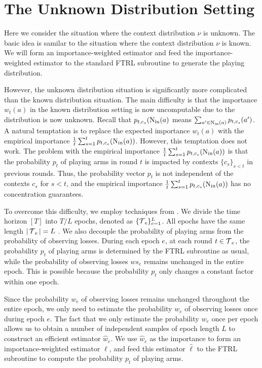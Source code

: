 \section{The Unknown Distribution Setting}

Here we consider the situation where the context distribution $\nu$ is unknown. The basic idea is samilar to the situation where the  context distribution $\nu$ is known. We will form an importance-weighted estimator and feed the importance-weighted estimator to the standard FTRL subroutine to generate the playing distribution.

However, the unknown distribution situation is significantly more complicated than the known distribution situation. The main difficulty is that the importance $w_t(a)$ in the known distribution setting is now uncomputable  due to the distribution is now unknown. 
%
Recall that $p_{t,c_s}(\operatorname{N_{\text{in}}}(a)$ means  $\sum_{a' \in \operatorname{N_{\text{in}}}(a)} p_{t,c_s}(a')$.
%
A natural temptation is to replace the expected importance $w_t(a)$ with the empirical importance  $\frac{1}{t} \sum_{s=1}^t  p_{t,c_s}(\operatorname{N_{\text{in}}}(a))$.
%
However, this temptation does not work. The problem with the empirical importance $\frac{1}{t} \sum_{s=1}^t p_{t,c_s}(\operatorname{N_{\text{in}}}(a))$ is that the probability $p_t$ of playing arms in round $t$ is impacted by contexts $\{c_s\}_{s < t}$ in previous rounds. Thus, the  probability vector $p_t$ is not independent of the contexts $c_s$ for $s<t$, and the empirical importance  $\frac{1}{t} \sum_{s=1}^t  p_{t,c_s}(\operatorname{N_{\text{in}}}(a))$ has no concentration guarantees.

To overcome this difficulty, we employ techniques from \citet{Sch23}. We divide the time horizon $[T]$ into $T/L$ epochs, denoted as $\{\operatorname{\mathcal{T}}_e\}_{e = 1}^{L}$. All epochs have the same length $|\operatorname{\mathcal{T}}_e| = L$ . We also decouple the probability of playing arms from the probability of observing losses. During each epoch $e$, at each round $t \in \operatorname{\mathcal{T}}_e$, the probability $p_t$ of playing arms is determined by the FTRL subroutine as usual, while the probability of observing losses $ws_e$ remains unchanged in the entire epoch. This is possible because the probability $p_t$ only changes a constant factor within one epoch.

Since the probability $w_e$ of observing losses remains unchanged throughout the entire epoch, we only need to estimate the probability $w_e$ of observing losses once during epoch $e$. The fact that we only estimate the probability $w_e$ once per epoch allows us to obtain a number of independent samples of epoch length $L$  to construct an efficient estimator $\widehat{w}_e$. We use $\widehat{w}_e$ as the importance to form an importance-weighted  estimator $\widehat{\ell}$, and feed this estimator $\widehat{\ell}$ to the FTRL subroutine to compute the probability $p_t$ of playing arms. 

